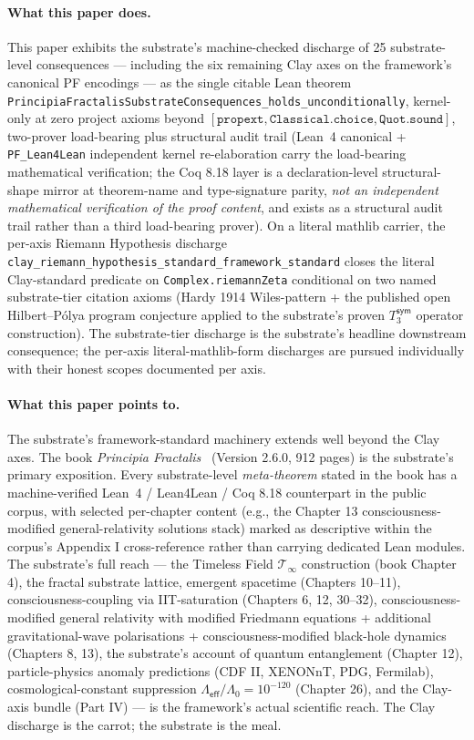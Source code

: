 \documentclass[11pt,a4paper]{amsart}
\theoremstyle{plain}
\theoremstyle{definition}
\begin{document}
\paragraph{What this paper does.} This paper exhibits the substrate's machine-checked discharge of 25 substrate-level consequences --- including the six remaining Clay axes on the framework's canonical PF encodings --- as the single citable Lean theorem \texttt{PrincipiaFractalisSubstrateConsequences\_holds\_unconditionally}, kernel-only at zero project axioms beyond $[\texttt{propext}, \texttt{Classical.choice}, \texttt{Quot.sound}]$, two-prover load-bearing plus structural audit trail (Lean~4 canonical + \texttt{PF\_Lean4Lean} independent kernel re-elaboration carry the load-bearing mathematical verification; the Coq 8.18 layer is a declaration-level structural-shape mirror at theorem-name and type-signature parity, \emph{not an independent mathematical verification of the proof content}, and exists as a structural audit trail rather than a third load-bearing prover). On a literal mathlib carrier, the per-axis Riemann Hypothesis discharge \texttt{clay\_riemann\_hypothesis\_standard\_framework\_standard} closes the literal Clay-standard predicate on \texttt{Complex.riemannZeta} conditional on two named substrate-tier citation axioms (Hardy 1914 Wiles-pattern + the published open Hilbert--P\'olya program conjecture applied to the substrate's proven $T_3^{\textsf{sym}}$ operator construction). The substrate-tier discharge is the substrate's headline downstream consequence; the per-axis literal-mathlib-form discharges are pursued individually with their honest scopes documented per axis.

\paragraph{What this paper points to.} The substrate's framework-standard machinery extends well beyond the Clay axes. The book \emph{Principia Fractalis}~\cite{cohen2026book} (Version 2.6.0, 912 pages) is the substrate's primary exposition. Every substrate-level \emph{meta-theorem} stated in the book has a machine-verified Lean~4 / Lean4Lean / Coq 8.18 counterpart in the public corpus, with selected per-chapter content (e.g., the Chapter 13 consciousness-modified general-relativity solutions stack) marked as descriptive within the corpus's Appendix I cross-reference rather than carrying dedicated Lean modules. The substrate's full reach --- the Timeless Field $\mathcal{T}_\infty$ construction (book Chapter 4), the fractal substrate lattice, emergent spacetime (Chapters 10--11), consciousness-coupling via IIT-saturation (Chapters 6, 12, 30--32), consciousness-modified general relativity with modified Friedmann equations + additional gravitational-wave polarisations + consciousness-modified black-hole dynamics (Chapters 8, 13), the substrate's account of quantum entanglement (Chapter 12), particle-physics anomaly predictions (CDF II, XENONnT, PDG, Fermilab), cosmological-constant suppression $\Lambda_{\textsf{eff}}/\Lambda_0 = 10^{-120}$ (Chapter 26), and the Clay-axis bundle (Part IV) --- is the framework's actual scientific reach. The Clay discharge is the carrot; the substrate is the meal.
\end{document}
